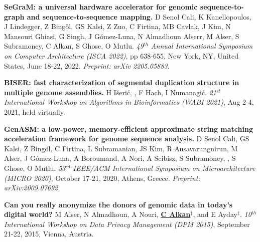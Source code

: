 


\vspace{-.2cm}
{\bf 
SeGraM: a universal hardware accelerator for genomic sequence-to-graph and sequence-to-sequence mapping.} 
D Senol Cali, K Kanellopoulos, J Lindegger, Z Bingöl, GS Kalsi, Z Zuo, C Firtina, MB Cavlak, J Kim, N Mansouri Ghiasi, G Singh, J Gómez-Luna, N Almadhoun Alserr, M Alser, S Subramoney, C Alkan, S Ghose, O Mutlu.
{\em 49$^{th}$ Annual International Symposium on Computer Architecture (ISCA 2022)}, pp 638-655, New York, NY, United States, June 18-22, 2022.
\textit{Preprint: arXiv 2205.05883}.


\vspace{-.2cm}
{\bf BISER: fast characterization of segmental
duplication structure in multiple genome
assemblies.} H  Išerić, \calkan{}, F Hach, I Numanagić. 
{\em 21$^{st}$ International Workshop on Algorithms in Bioinformatics (WABI 2021)}, Aug 2-4, 2021, held virtually. 

\vspace{-.2cm}
{\bf GenASM: a low-power, memory-efficient approximate string matching acceleration framework for genome sequence analysis.}
D Senol Cali, GS Kalsi, Z Bingöl, C Firtina, L Subramanian,  JS Kim, R Ausavarungnirun, M Alser,
 J Gómez-Luna, A Boroumand, A Nori, A Scibisz, S Subramoney, \calkan{}, S Ghose, O Mutlu.
{\em 53$^{rd}$ IEEE/ACM International Symposium on Microarchitecture (MICRO 2020)}, October 17-21, 2020, Athens, Greece. \textit{Preprint: arXiv:2009.07692.}

\vspace{-.2cm}
{\bf Can you really anonymize the donors of genomic data in today's digital world?}
M Alser, N Almadhoun, A Nouri, {\bf {\underline{C Alkan}}}$^\ddag$, and E Ayday$^\ddag$. 
{\em 10$^{th}$ International Workshop on Data Privacy Management (DPM 2015)}, 
 September 21-22, 2015, Vienna, Austria.

